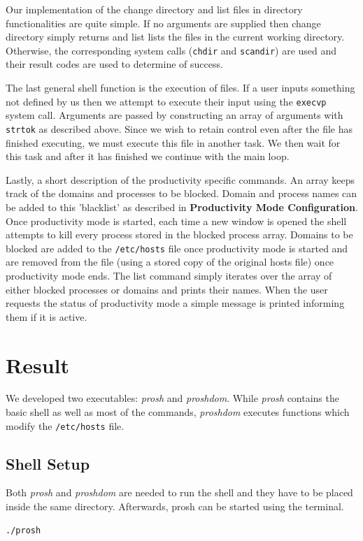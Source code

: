 \documentclass{article}
\begin{document}
Our implementation of the change directory and list files in directory functionalities are quite simple. If no arguments are supplied then change directory simply returns and list lists the files in the current working directory. Otherwise, the corresponding system calls (\texttt{chdir} and  \texttt{scandir}) are used and their result codes are used to determine of success.

The last general shell function is the execution of files. If a user inputs something not defined by us then we attempt to execute their input using the  \texttt{execvp} system call. Arguments are passed by constructing an array of arguments with  \texttt{strtok} as described above. Since we wish to retain control even after the file has finished executing, we must execute this file in another task. We then wait for this task and after it has finished we continue with the main loop.

Lastly, a short description of the productivity specific commands. An array keeps track of the domains and processes to be blocked. Domain and process names can be added to this 'blacklist' as described in \textbf{Productivity Mode Configuration}. Once productivity mode is started, each time a new window is opened the shell attempts to kill every process stored in the blocked process array. Domains to be blocked are added to the  \texttt{/etc/hosts} file once productivity mode is started and are removed from the file (using a stored copy of the original hosts file) once productivity mode ends. The list command simply iterates over the array of either blocked processes or domains and prints their names. When the user requests the status of productivity mode a simple message is printed informing them if it is active.

\section{Result}

We developed two executables: \textit{prosh} and \textit{proshdom}. While \textit{prosh} contains the basic shell as well as most of the commands, \textit{proshdom} executes functions which modify the \texttt{/etc/hosts} file. 

\subsection{Shell Setup}

Both \textit{prosh} and \textit{proshdom} are needed to run the shell and they have to be placed inside the same directory. Afterwards, prosh can be started using the terminal.
\begin{lstlisting}[numbers=none]
./prosh
\end{lstlisting}
\end{document}

